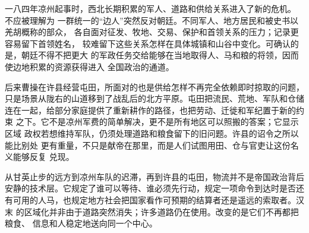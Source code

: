 一八四年凉州起事时，西北长期积累的军人、道路和供给关系进入了新的危机。
不应被理解为
一群统一的“边人”突然反对朝廷。不同军人、地方居民和被史书以羌胡概称的部众，
各自面对征发、牧地、交易、保护和首领关系的压力；记录更容易留下首领姓名，
较难留下这些关系怎样在具体城镇和山谷中变化。可确认的是，朝廷不得不把更大
的军政任务交给能够在当地取得人、马和粮的将领，因而使边地积累的资源获得进入
全国政治的通道。

后来曹操在许县经营屯田，所面对的也是供给怎样不再完全依赖即时掠取的问题，
只是场景从陇右的山道移到了战乱后的北方平原。屯田把流民、荒地、军队和仓储
连在一起，给部分家庭提供了重新耕作的路径，也把劳动、迁徙和军纪置于新的约束
之下。它不是凉州军费的简单解决，更不是所有地区可以照搬的答案；它显示区域
政权若想维持军队，仍须处理道路和粮食留下的旧问题。许县的诏令之所以能比别处
更有重量，不只是献帝在那里，而是人们试图用田、仓与官吏让这份名义能够反复
兑现。

从甘英止步的远方到凉州车队的迟滞，再到许县的屯田，物流并不是帝国政治背后
安静的技术层。它规定了谁可以等待、谁必须先行动，规定一项命令到达时是否还
有可用的人马，也规定地方社会把国家看作可预期的结算者还是遥远的索取者。汉末
的区域化并非由于道路突然消失；许多道路仍在使用。改变的是它们不再都把粮食、
信息和人稳定地送向同一个中心。

